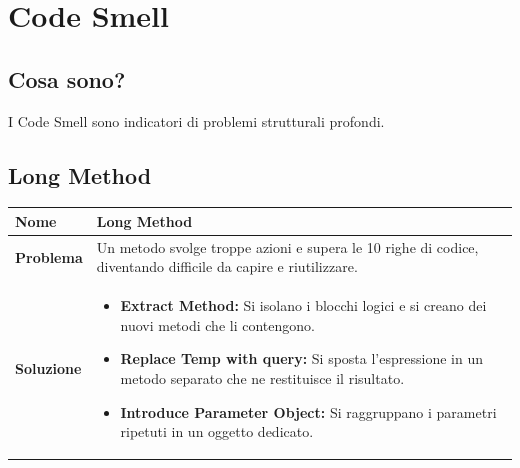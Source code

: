 \chapter{Code Smell}
\section{Cosa sono?}
I Code Smell sono indicatori di problemi strutturali profondi.

\section{Long Method}
\begin{table}[h]
    \centering
    \renewcommand{\arraystretch}{1.2} %
    \begin{tabularx}{\textwidth}{l X}
        \toprule
        \textbf{Nome} & Long Method \\
        \midrule
        \textbf{Problema} & Un metodo svolge troppe azioni e supera le 10 righe di codice, diventando difficile da capire e riutilizzare. \\
        \midrule
        \textbf{Soluzione} & 
        \begin{itemize}
            \item \textbf{Extract Method:} Si isolano i blocchi logici e si creano dei nuovi metodi che li contengono.
            \item \textbf{Replace Temp with query:} Si sposta l'espressione in un metodo separato che ne restituisce il risultato.
            \item \textbf{Introduce Parameter Object:} Si raggruppano i parametri ripetuti in un oggetto dedicato.
        \end{itemize}
        \\ %
        \bottomrule
    \end{tabularx}
\end{table}

